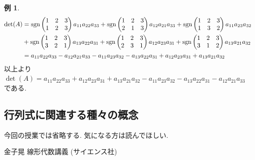 \documentclass[dvipdfmx,a4paper,11pt]{article}
\newcommand{\sgn}{{\rm sgn}}
\theoremstyle{definition}
\newtheorem{exa}[thm]{例}
\begin{document}
\begin{exa}
  \begin{align*}
  \det(A) 
  &= 
  \sgn \begin{pmatrix}
1& 2 &3\\
1& 2 &3\\
 \end{pmatrix}
 a_{11}a_{22}a_{33}
 +
   \sgn \begin{pmatrix}
1& 2 &3\\
2& 1 &3\\
 \end{pmatrix} 
 a_{12}a_{21}a_{33}
 +
\sgn \begin{pmatrix}
1& 2 &3\\
1& 3 &2\\
 \end{pmatrix} 
 a_{11}a_{23}a_{32} 
  \\%
  &+
\sgn  \begin{pmatrix}
1& 2 &3\\
3& 2 &1\\
 \end{pmatrix}
 a_{13}a_{22}a_{31} 
 +
\sgn  \begin{pmatrix}
1& 2 &3\\
2& 3 &1\\
 \end{pmatrix}
 a_{12}a_{23}a_{31} 
  +
\sgn   \begin{pmatrix}
1& 2 &3\\
3& 1 &2\\
 \end{pmatrix}
 a_{13}a_{21}a_{32} 
 \\%
   &= a_{11}a_{22}a_{33}- a_{12}a_{21}a_{33}- a_{11}a_{23}a_{32} 
   - a_{13}a_{22}a_{31}  + a_{12}a_{23}a_{31}  +  a_{13}a_{21}a_{32} 
  \end{align*}
  以上より
  $
 \det(A)= 
 a_{11}a_{22}a_{33}+ a_{12}a_{23}a_{31}  +  a_{13}a_{21}a_{32} 
- a_{11}a_{23}a_{32}     - a_{13}a_{22}a_{31}  - a_{12}a_{21}a_{33}
  $
  である.
\end{exa}




\subsection{行列式に関連する種々の概念\cite[3.6節]{M}}
今回の授業では省略する. 
気になる方は読んでほしい. 

\begin{thebibliography}{n}
金子晃 線形代数講義 (サイエンス社)
\end{thebibliography}
 
\end{document}
